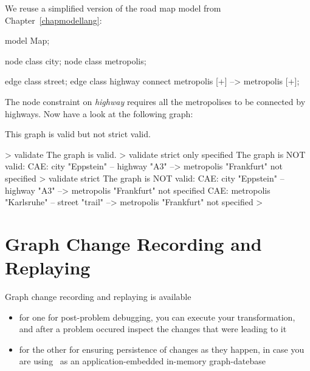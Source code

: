 \begin{example}
We reuse a simplified version of the road map model from Chapter~\ref{chapmodellang}:
\begin{grgen}
model Map;

node class city;
node class metropolis;

edge class street;
edge class highway
      connect metropolis [+] --> metropolis [+];
\end{grgen}
The node constraint on \emph{highway} requires all the metropolises to be connected by highways. Now have a look at the following graph:
\begin{center}
\end{center}

This graph is valid but not strict valid.
\begin{grshell}
> validate
The graph is valid.
> validate strict only specified
The graph is NOT valid:
  CAE: city "Eppstein" -- highway "A3" --> metropolis "Frankfurt" not specified
> validate strict
The graph is NOT valid:
  CAE: city "Eppstein" -- highway "A3" --> metropolis "Frankfurt" not specified
  CAE: metropolis "Karlsruhe" -- street "trail" --> metropolis "Frankfurt" not specified
>
\end{grshell}
\end{example}


\section{Graph Change Recording and Replaying}
\label{recordnreplay}

Graph change recording and replaying is available 
\begin{itemize}
	\item for one for post-problem debugging, you can execute your transformation, and after a problem occured inspect the changes that were leading to it
	\item for the other for ensuring persistence of changes as they happen, in case you are using \GrG\ as an application-embedded in-memory graph-datebase
\end{itemize}

